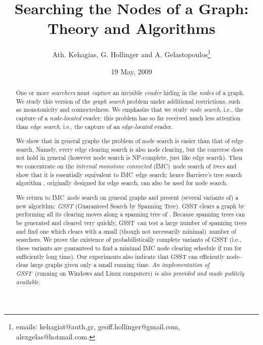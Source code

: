 \documentclass[11pt]{article}\usepackage{amsmath}
\begin{document}
\title{Searching the Nodes of a Graph: Theory and Algorithms}
\author{Ath. Kehagias, G. Hollinger and A. Gelastopoulos\thanks{emails:
kehagiat@auth.gr, geoff.hollinger@gmail.com, alexgelas@hotmail.com.}}
\date{19 May, 2009}
\maketitle

\begin{abstract}
One or more \emph{searchers} must \emph{capture} an invisible \emph{evader}
hiding in the \emph{nodes} of a graph. We study this version of the
\emph{graph search} problem under additional restrictions, such as
monotonicity and connectedness. We emphasize that we study \emph{node search},
i.e., the capture of a \emph{node-located }evader; this problem has so far
received much less attention than \emph{edge search}, i.e., the capture of an
\emph{edge-located} evader.

We show that in general graphs the problem of node search is easier than that
of edge search, Namely, every edge clearing search is also node clearing, but
the converse does not hold in general (however node search is NP-complete,
just like edge search). Then we concentrate on the \emph{internal monotone
connected }(IMC)\ node search of \emph{trees} and show that it is essentially
equivalent to IMC\ edge search; hence Barriere's tree search algorithm
\cite{Barriere1}, originally designed for edge search, can also be used for
node search.

We return to IMC\ node search on general graphs and present (several variants
of) a new algorithm: \emph{GSST }(Guaranteed Search by Spanning Tree). GSST
clears a graph  by performing all its clearing moves along a
spanning tree  of . Because spanning trees can be
generated and cleared very quickly, GSST\ can test a large number of spanning
trees and find one which clears  with a small (though not
necessarily minimal)\ number of searchers. We prove the existence of
probabilistically complete variants of GSST (i.e., these variants are
guaranteed to find a minimal IMC node clearing schedule if run for
sufficiently long time). Our experiments also indicate that GSST can
efficiently node-clear large graphs given only a small running time. \emph{An
implementation of GSST\ }(running on Windows and Linux computers) \emph{is
also provided and made publicly available}.

\end{abstract}
\end{document}
